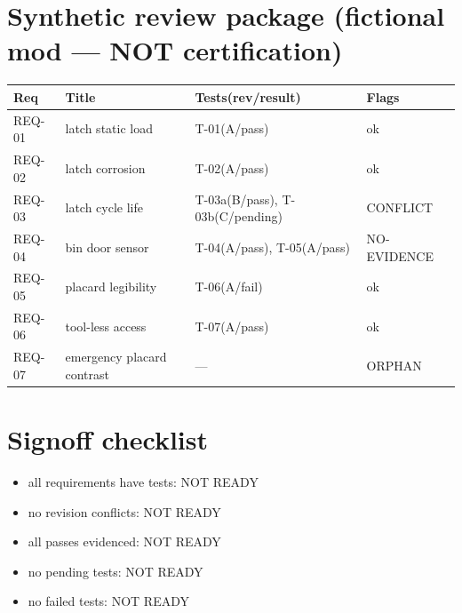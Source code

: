 \documentclass[a4paper,11pt]{article}
\begin{document}
\section*{Synthetic review package (fictional mod --- NOT certification)}
\begin{longtable}{l l l l}
Req & Title & Tests(rev/result) & Flags\\\hline
REQ-01 & latch static load & T-01(A/pass) & ok \\
REQ-02 & latch corrosion & T-02(A/pass) & ok \\
REQ-03 & latch cycle life & T-03a(B/pass), T-03b(C/pending) & CONFLICT \\
REQ-04 & bin door sensor & T-04(A/pass), T-05(A/pass) & NO-EVIDENCE \\
REQ-05 & placard legibility & T-06(A/fail) & ok \\
REQ-06 & tool-less access & T-07(A/pass) & ok \\
REQ-07 & emergency placard contrast & --- & ORPHAN \\
\end{longtable}
\section*{Signoff checklist}
\begin{itemize}
\item[$\square$] all requirements have tests: NOT READY
\item[$\square$] no revision conflicts: NOT READY
\item[$\square$] all passes evidenced: NOT READY
\item[$\square$] no pending tests: NOT READY
\item[$\square$] no failed tests: NOT READY
\end{itemize}
\end{document}
